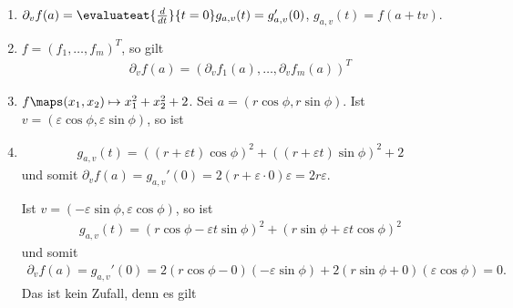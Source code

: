 \begin{bembspe}
    \begin{enumerate}
        \item \( \partial_v f(a)=\evaluateat{\frac{d}{dt}}{t=0} g_{a,v}(t)=g_{a,v}'(0) \), \( g_{a,v}(t)=f(a+tv) \).
        \item \( f=(f_1,\dotsc,f_m)^T \), so gilt
        \begin{align*}
            \partial_v f(a)=(\partial_v f_1(a),\dotsc, \partial_v f_m(a))^T
        \end{align*}
            \item \( f\maps (x_1,x_2)\mapsto x_1^2+x_2^2+2 \). Sei \( a=(r\cos \phi, r\sin \phi) \). Ist \( v=(\varepsilon \cos \phi, \varepsilon\sin \phi) \), so ist
            \item \begin{align*}
                g_{a,v}(t)=((r+\varepsilon t)\cos \phi)^2+((r+\varepsilon t)\sin \phi)^2+2
            \end{align*}
            und somit \( \partial_v f(a)=g_{a,v}'(0)=2(r+\varepsilon \cdot 0)\varepsilon=2r\varepsilon \).
            
            Ist \( v=(-\varepsilon \sin \phi, \varepsilon \cos \phi) \), so ist
            \begin{align*}
                g_{a,v}(t)=(r \cos \phi-\varepsilon t\sin \phi)^2+(r\sin \phi+\varepsilon t \cos \phi)^2
            \end{align*}
            und somit
            \begin{align*}
                \partial_v f(a)=g_{a,v}'(0)=2(r\cos \phi-0)(-\varepsilon \sin \phi)+2(r\sin \phi+0)(\varepsilon \cos \phi)=0.
            \end{align*}
            Das ist kein Zufall, denn es gilt
    \end{enumerate}
\end{bembspe}
